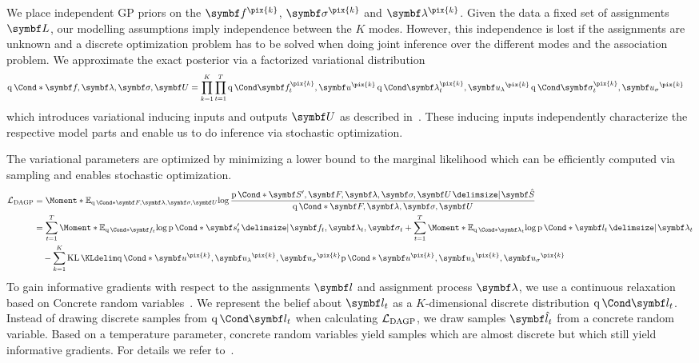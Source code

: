 We place independent GP priors on the $\mat{f}^{\pix{k}}$, $\mat{\sigma}^{\pix{k}}$ and $\mat{\lambda}^{\pix{k}}$.
Given the data a fixed set of assignments $\mat{L}$, our modelling assumptions imply independence between the $K$ modes.
However, this independence is lost if the assignments are unknown and a discrete optimization problem has to be solved when doing joint inference over the different modes and the association problem.
We approximate the exact posterior via a factorized variational distribution
\begin{align}
    \Variat*{\mat{f}, \mat{\lambda}, \mat{\sigma}, \mat{U}} &=
    \prod_{k=1}^K\prod_{t=1}^T \Variat{\mat{f}_t^{\pix{k}}, \mat{u}^{\pix{k}}} \Variat{\mat{\lambda}_t^{\pix{k}}, \mat{u_\lambda}^{\pix{k}}} \Variat{\mat{\sigma}_t^{\pix{k}}, \mat{u_\sigma}^{\pix{k}}}
\end{align}
which introduces variational inducing inputs and outputs $\mat{U}$ as described in~\parencite{damianou_deep_2013,hensman_scalable_2015,kaiser_data_2018}.
These inducing inputs independently characterize the respective model parts and enable us to do inference via stochastic optimization.

The variational parameters are optimized by minimizing a lower bound to the marginal likelihood which can be efficiently computed via sampling and enables stochastic optimization.
\begin{align}
\begin{split}
    \label{eq:interpretable_reinforcement_learning:variational_bound}
    \Lc_{\text{DAGP}} &= \Moment*{\E_{\Variat*{\mat{F}, \mat{\lambda}, \mat{\sigma}, \mat{U}}}}{\log\frac{\Prob*{\mat{S}^\prime, \mat{F}, \mat{\lambda}, \mat{\sigma}, \mat{U} \given \mat{\hat{S}}}}{\Variat*{\mat{F}, \mat{\lambda}, \mat{\sigma}, \mat{U}}}} \\
    &=
    \sum_{t=1}^T \Moment*{\E_{\Variat*{\mat{f}_t}}}{\log \Prob*{\mat{s}^\prime_t \given \mat{f}_t, \mat{\lambda}_t, \mat{\sigma}_t}}
    + \sum_{t=1}^T \Moment*{\E_{\Variat*{\mat{\lambda}_t}}}{\log \Prob*{\mat{l}_t \given \mat{\lambda}_t}} \\
    &\quad
    - \sum_{k=1}^K \KL{\Variat*{\mat{u}^{\pix{k}}, \mat{u_\lambda}^{\pix{k}}, \mat{u_\sigma}^{\pix{k}}}}{\Prob*{\mat{u}^{\pix{k}}, \mat{u_\lambda}^{\pix{k}}, \mat{u_\sigma}^{\pix{k}}}}
\end{split}
\end{align}
To gain informative gradients with respect to the assignments $\mat{l}$ and assignment process $\mat{\lambda}$, we use a continuous relaxation based on Concrete random variables~\parencite{maddison_concrete_2016}.
We represent the belief about $\mat{l}_t$ as a $K$-dimensional discrete distribution $\Variat{\mat{l}_t}$.
Instead of drawing discrete samples from $\Variat{\mat{l}_t}$ when calculating $\mathcal{L}_{\text{DAGP}}$, we draw samples $\mat{\hat{l}}_t$ from a concrete random variable.
Based on a temperature parameter, concrete random variables yield samples which are almost discrete but which still yield informative gradients.
For details we refer to~\parencite{kaiser_data_2018}.

